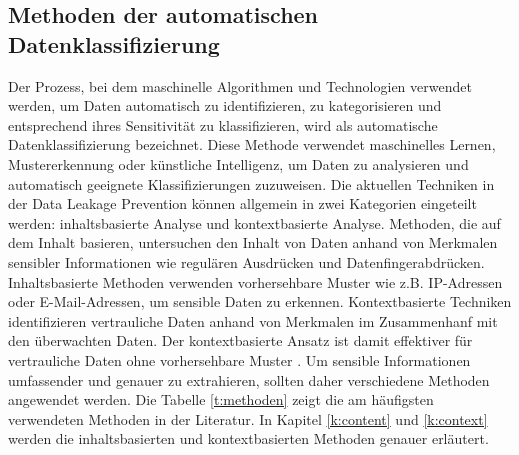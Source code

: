 \subsection{Methoden der automatischen Datenklassifizierung}
Der Prozess, bei dem maschinelle Algorithmen und Technologien verwendet werden, um Daten automatisch zu identifizieren, zu kategorisieren und entsprechend ihres Sensitivität zu klassifizieren, wird als automatische Datenklassifizierung bezeichnet. Diese Methode verwendet maschinelles Lernen, Mustererkennung oder künstliche Intelligenz, um Daten zu analysieren und automatisch geeignete Klassifizierungen zuzuweisen.
Die aktuellen Techniken in der Data Leakage Prevention können allgemein in zwei Kategorien eingeteilt werden: inhaltsbasierte Analyse und kontextbasierte Analyse. Methoden, die auf dem Inhalt basieren, untersuchen den Inhalt von Daten anhand von Merkmalen sensibler Informationen wie regulären Ausdrücken und Datenfingerabdrücken. Inhaltsbasierte Methoden verwenden vorhersehbare Muster wie z.B. IP-Adressen oder E-Mail-Adressen, um sensible Daten zu erkennen. Kontextbasierte Techniken identifizieren vertrauliche Daten anhand von Merkmalen im Zusammenhanf mit den überwachten Daten. Der kontextbasierte Ansatz ist damit effektiver für vertrauliche Daten ohne vorhersehbare Muster \cite{Guo.2021}\cite{Gugelmann.2015}\cite{Kuzina.2023}. Um sensible Informationen umfassender und genauer zu extrahieren, sollten daher verschiedene Methoden angewendet werden. Die Tabelle \ref{t:methoden} zeigt die am häufigsten verwendeten Methoden in der Literatur. In Kapitel \ref{k:content} und \ref{k:context} werden die inhaltsbasierten und kontextbasierten Methoden genauer erläutert.

